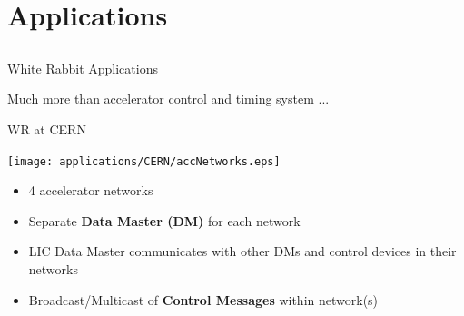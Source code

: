 \documentclass[compress,red]{beamer}
\begin{document}
\section{Applications}
\subsection{}
\begin{frame}{White Rabbit Applications}

    \begin{center}
      Much more than accelerator control and timing system ...
    \end{center}


\end{frame}
\begin{frame}{WR at CERN}

      \begin{center}
      \texttt{[image: applications/CERN/accNetworks.eps]}
      \end{center}

  \begin{itemize}
    \item 4 accelerator networks
    \item Separate {\bf Data Master (DM)} for each network
    \item \textcolor{green!90}{LIC Data Master} communicates with other DMs and control devices in their networks
    \item Broadcast/Multicast of {\bf Control Messages} within network(s)
  \end{itemize}

\end{frame}
\end{document}
